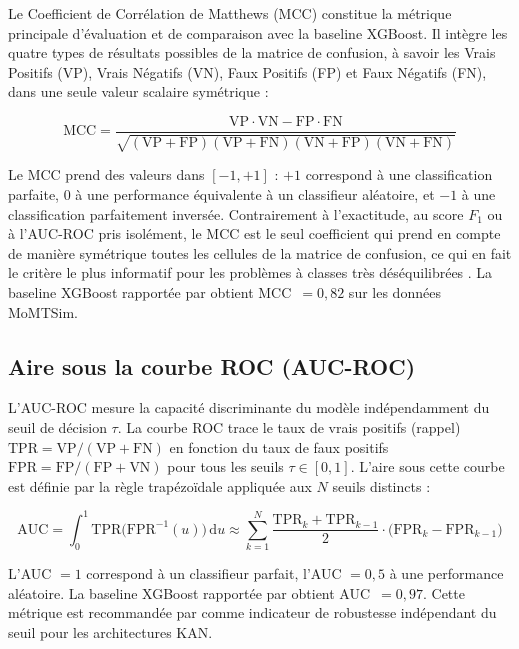 \documentclass[11pt,a4paper,oneside]{report}
\theoremstyle{definition}
\theoremstyle{remark}
\begin{document}
Le Coefficient de Corrélation de Matthews (MCC) constitue la métrique principale d'évaluation et de comparaison avec la baseline XGBoost. Il intègre les quatre types de résultats possibles de la matrice de confusion, à savoir les Vrais Positifs (VP), Vrais Négatifs (VN), Faux Positifs (FP) et Faux Négatifs (FN), dans une seule valeur scalaire symétrique :

\begin{equation}
    \text{MCC} = \frac{\text{VP} \cdot \text{VN} - \text{FP} \cdot \text{FN}}
                      {\sqrt{(\text{VP}+\text{FP})(\text{VP}+\text{FN})(\text{VN}+\text{FP})(\text{VN}+\text{FN})}}
    \label{eq:mcc}
\end{equation}

Le MCC prend des valeurs dans $[-1, +1]$ : $+1$ correspond à une classification parfaite, $0$ à une performance équivalente à un classifieur aléatoire, et $-1$ à une classification parfaitement inversée. Contrairement à l'exactitude, au score $F_1$ ou à l'AUC-ROC pris isolément, le MCC est le seul coefficient qui prend en compte de manière symétrique toutes les cellules de la matrice de confusion, ce qui en fait le critère le plus informatif pour les problèmes à classes très déséquilibrées \citep{somvanshi2025survey}. La baseline XGBoost rapportée par \citet{azamuke2025rich} obtient MCC~$= 0{,}82$ sur les données MoMTSim.

\subsection{Aire sous la courbe ROC (AUC-ROC)}
\label{subsec:auc}

L'AUC-ROC mesure la capacité discriminante du modèle indépendamment du seuil de décision $\tau$. La courbe ROC trace le taux de vrais positifs (rappel) $\text{TPR} = \text{VP}/(\text{VP}+\text{FN})$ en fonction du taux de faux positifs $\text{FPR} = \text{FP}/(\text{FP}+\text{VN})$ pour tous les seuils $\tau \in [0,1]$. L'aire sous cette courbe est définie par la règle trapézoïdale appliquée aux $N$ seuils distincts :

\begin{equation}
    \text{AUC} = \int_0^1 \mathrm{TPR}\bigl(\mathrm{FPR}^{-1}(u)\bigr)\,\mathrm{d}u
    \approx \sum_{k=1}^{N} \frac{\mathrm{TPR}_k + \mathrm{TPR}_{k-1}}{2}
                                 \cdot \bigl(\mathrm{FPR}_k - \mathrm{FPR}_{k-1}\bigr)
    \label{eq:auc}
\end{equation}

L'AUC $= 1$ correspond à un classifieur parfait, l'AUC $= 0{,}5$ à une performance aléatoire. La baseline XGBoost rapportée par \citet{azamuke2025rich} obtient AUC~$= 0{,}97$. Cette métrique est recommandée par \citet{hou2024critical} comme indicateur de robustesse indépendant du seuil pour les architectures KAN.
\end{document}
